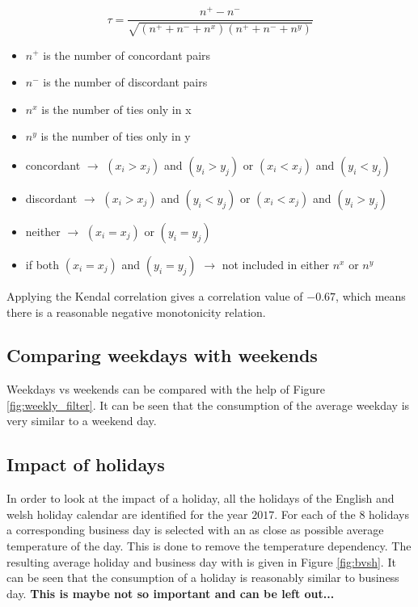 \begin{equation}\label{eq:kendall}
	\tau = \frac{n^+-n^-}{\sqrt{(n^++n^-+n^x)(n^++n^-+n^y)}}
\end{equation}
\begin{itemize}
	\item $ n^+ $ is the number of concordant pairs
	\item $ n^- $ is the number of discordant pairs
	\item $ n^x $ is the number of ties only in x
	\item $ n^y $ is the number of ties only in y
	\item concordant $\rightarrow $ $ (x_i > x_j ) $ and $ (y_i > y_j ) $ or $ (x_i < x_j ) $ and $ (y_i < y_j ) $
	\item discordant $\rightarrow $ $ (x_i > x_j ) $ and $ (y_i < y_j ) $ or $ (x_i < x_j ) $ and $ (y_i > y_j ) $
	\item neither $\rightarrow $ $ (x_i = x_j ) $ or $ (y_i = y_j ) $
	\item if both $ (x_i = x_j ) $ and $ (y_i = y_j ) $ $\rightarrow $ not included in either $ n^x $ or $ n^y $
\end{itemize}

Applying the Kendal correlation  gives a correlation value of $ -0.67$, which means there is a reasonable negative monotonicity relation.\\



\subsection{Comparing weekdays with weekends}
Weekdays vs weekends can be compared with the help of Figure \ref{fig:weekly_filter}. It can be seen that the consumption of the average weekday is very similar to a weekend day. 


\subsection{Impact of holidays}
In order to look at the impact of a holiday, all the holidays of the English and welsh holiday calendar are identified for the year $ 2017 $. For each of the $ 8 $ holidays a corresponding business day is selected with an as close as possible average temperature of the day. This is done to remove the temperature dependency. The resulting average holiday and business day with is given in Figure \ref{fig:bvsh}. It can be seen that the consumption of a holiday is reasonably similar to business day.  \textbf{This is maybe not so important and can be left out...}

